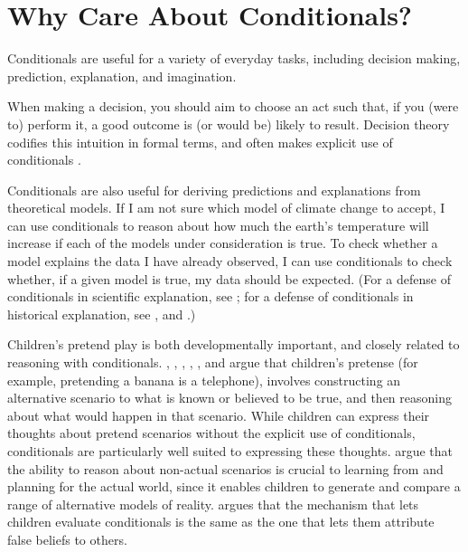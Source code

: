 \section{Why Care About Conditionals?}

Conditionals are useful for a variety of everyday tasks, including decision making, prediction, explanation, and imagination.

When making a decision, you should aim to choose an act such that, if you (were to) perform it, a good outcome is (or would be) likely to result.  Decision theory codifies this intuition in formal terms, and often makes explicit use of conditionals   \citep{gibbard-harper, vinci-decision, bradley-conditionals, Cantwell2013-CANCIC}.

Conditionals are also useful for deriving predictions and explanations from theoretical models.  If I am not sure which model of climate change to accept, I can use conditionals to reason about how much the earth's temperature will increase if each of the models under consideration is true.  To check whether a model explains the data I have already observed, I can use conditionals to check whether, if a given model is true, my data should be expected.  (For a defense of conditionals in scientific explanation, see \citealp{Woodward2004-WOOCAC}; for a defense of conditionals in historical explanation, see \citealp{Reiss2009-REICTE}, and \citealp{Nolan2013-NOLWHA}.)

Children's pretend play is both developmentally important, and closely related to reasoning with conditionals.  \citet{amsel-smalley}, \citet{dias-harris}, \citet{gopnik-phil-baby}, \citet{harris-imagination}, \citet{lillard-pretend}, and \citet{walton-mimesis} argue that children's pretense (for example, pretending a banana is a telephone), involves constructing an alternative scenario to what is known or believed to be true, and then reasoning about what would happen in that scenario.  While children can express their thoughts about pretend scenarios without the explicit use of conditionals, conditionals are particularly well suited to expressing these thoughts.  \citet{weisberg-gopnik} argue that the ability to reason about non-actual scenarios is crucial to learning from and planning for the actual world, since it enables children to generate and compare a range of alternative models of reality.  \citet{kryzyzanowska} argues that the mechanism that lets children evaluate conditionals is the same as the one that lets them attribute false beliefs to others.

